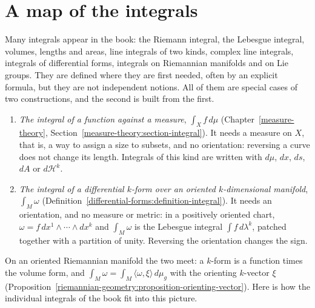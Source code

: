 \section{A map of the integrals}\label{introduction:section-integration}

Many integrals appear in the book: the Riemann integral, the Lebesgue integral, volumes, lengths and areas, line integrals of two kinds, complex line integrals, integrals of differential forms,
integrals on Riemannian manifolds and on Lie groups. They are defined where they are first needed, often by an explicit formula, but they are not independent notions. All of them are special cases
of two constructions, and the second is built from the first.
\begin{enumerate}
\item \emph{The integral of a function against a measure}, $\int_Xf\,d\mu$ (Chapter~\ref{measure-theory}, Section~\ref{measure-theory:section-integral}). It needs a measure on $X$, that is, a way to assign a size to
subsets, and no orientation: reversing a curve does not change its length. Integrals of this kind are written with $d\mu$, $dx$, $ds$, $dA$ or $d\mathcal{H}^k$.
\item \emph{The integral of a differential $k$-form over an oriented $k$-dimensional manifold}, $\int_M\omega$ (Definition~\ref{differential-forms:definition-integral}). It needs an orientation, and no measure or metric:
in a positively oriented chart, $\omega = f\,dx^1 \wedge \cdots \wedge dx^k$ and $\int_M\omega$ is the Lebesgue integral $\int f\,d\lambda^k$, patched together with a partition of unity. Reversing the orientation
changes the sign.
\end{enumerate}
On an oriented Riemannian manifold the two meet: a $k$-form is a function times the volume form, and $\int_M\omega = \int_M\langle\omega, \xi\rangle\,d\mu_g$ with the orienting $k$-vector $\xi$
(Proposition~\ref{riemannian-geometry:proposition-orienting-vector}). Here is how the individual integrals of the book fit into this picture.
